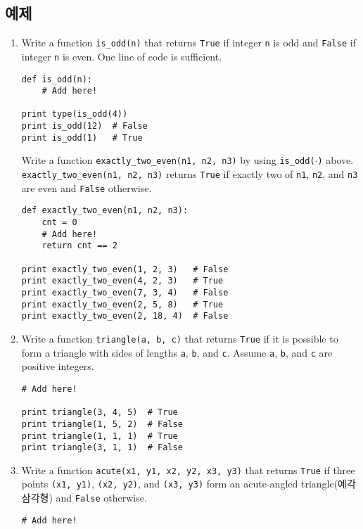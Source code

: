 \documentclass[../main.tex]{subfiles}
\begin{document}
\subsection{예제}
\begin{enumerate}
\item Write a function \texttt{is\_odd(n)} that returns \texttt{True} if integer \texttt{n} is odd and \texttt{False} if integer \texttt{n} is even.
One line of code is sufficient.
\begin{verbatim}
def is_odd(n):
	# Add here!

print type(is_odd(4))
print is_odd(12)  # False
print is_odd(1)   # True
\end{verbatim}
Write a function \texttt{exactly\_two\_even(n1, n2, n3)} by using \texttt{is\_odd($\cdot$)} above. \texttt{exactly\_two\_even(n1, n2, n3)} returns \texttt{True} if exactly two of \texttt{n1}, \texttt{n2}, and \texttt{n3} are even and \texttt{False} otherwise.
\begin{verbatim}
def exactly_two_even(n1, n2, n3):
	cnt = 0
	# Add here!
	return cnt == 2

print exactly_two_even(1, 2, 3)   # False
print exactly_two_even(4, 2, 3)   # True
print exactly_two_even(7, 3, 4)   # False
print exactly_two_even(2, 5, 8)   # True
print exactly_two_even(2, 18, 4)  # False
\end{verbatim}

\item Write a function \texttt{triangle(a, b, c)} that returns \texttt{True} if it is possible to form a triangle with sides of lengths \texttt{a}, \texttt{b}, and \texttt{c}.
Assume \texttt{a}, \texttt{b}, and \texttt{c} are positive integers.
\begin{verbatim}
# Add here!

print triangle(3, 4, 5)  # True
print triangle(1, 5, 2)  # False
print triangle(1, 1, 1)  # True
print triangle(3, 1, 1)  # False
\end{verbatim}

\item Write a function \texttt{acute(x1, y1, x2, y2, x3, y3)} that returns \texttt{True} if three points \texttt{(x1, y1)}, \texttt{(x2, y2)}, and \texttt{(x3, y3)} form an acute-angled triangle(예각 삼각형) and \texttt{False} otherwise.
\begin{verbatim}
# Add here!


\end{verbatim}
\end{enumerate}
\end{document}
